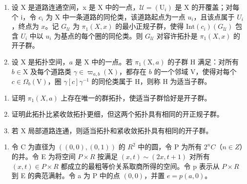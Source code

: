 \exercisegroup

\begin{enumerate}
\def\labelenumi{\arabic{enumi})}
\item
  设 X 是道路连通空间，x 是 X 中的一点，\(\mathcal{U} = (\mathrm{U}_{i})\) 是 X 的开覆盖；对每个 i，令 \(c_{i}\) 为 X 中一条道路的同伦类，该道路起点为一点 \(u_i\)，且该点属于 \(U_i\)，终点为 \(x\)。记 \(G_{\mathcal{U}}\) 为 \(\pi_1(X,x)\) 的最小正规子群，使得 \(\text{Int}(c_i)(G_{\mathcal{U}})\) 包含 \(U_i\) 中以 \(u_i\) 为基点的每个圈的同伦类。则 \(G_{\mathcal{U}}\) 对容许拓扑是 \(\pi_1(X,x)\) 的开子群。
\item
  设 X 是拓扑空间，\(a\) 是 X 中的一点。若 \(\pi_1(\mathrm{X}, a)\) 的子群 H 满足：对所有 \(b \in \mathrm{X}\) 及每个道路类 \(\gamma \in \varpi_{a,b}(\mathrm{X})\)，都存在 \(b\) 的一个邻域 V，使得对每个 \(c \in \Omega_b(\mathrm{V})\)，圈 \(\gamma[c]\gamma^{-1}\) 的同伦类属于 H，则称 H 为适当子群。
\end{enumerate}

\begin{enumerate}
\def\labelenumi{\alph{enumi})}
\item
  证明 \(\pi_{1}(X,a)\) 上存在唯一的群拓扑，使适当子群恰好是开子群。
\item
  证明此拓扑比紧收敛拓扑更细，但这两个拓扑具有相同的开正规子群。
\item
  若 X 局部道路连通，则适当拓扑和紧收敛拓扑具有相同的开子群。
\end{enumerate}

\begin{enumerate}
\def\labelenumi{\arabic{enumi})}
\setcounter{enumi}{2}
\tightlist
\item
  令 C 为直径为 \(((0,0),(0,1))\) 的 \(R^{2}\) 中的圆，令 P 为所有 \(2^{n}C\)（\(n \in Z\)）的并。令 E 为将空间 \(P \times R\) 按满足 \((x,t) \sim (2x,t+1)\) 对所有 \((x,t) \in P \times R\) 都成立的最粗等价关系取商所得的空间。令 p 表示从 \(P \times R\) 到 E 的典范满射。令 a 为 P 中的点 \((0,0)\)，并置 \(e = p(a,0)\)。
\end{enumerate}

